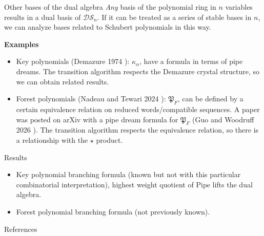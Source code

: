 \documentclass[aspectratio=169]{beamer}
\newcommand{\dcoma}{\mathcal{DS}}
\newcommand{\Forest}[1]{\mathfrak{P}_{#1}}
\newcommand{\RC}{\mathrm{Pipe}}
\begin{document}


\begin{frame}{Other bases of the dual algebra}
  \emph{Any} basis of the polynomial ring in $n$ variables results in a dual basis of $\dcoma_n$. If it can be treated as a series of stable bases in $n$, we can analyze bases related to Schubert polynomials in this way.

  \textbf{Examples}
\begin{itemize}
\item Key polynomials (Demazure 1974 \cite{demazure1974key}): $\kappa_\alpha$, have a formula in terms of pipe dreams. The transition algorithm respects the Demazure crystal structure, so we can obtain related results.
\item Forest polynomials (Nadeau and Tewari 2024 \cite{nadeau2024forest}): $\Forest{F}$, can be defined by a certain equivalence relation on reduced words/compatible sequences. 
A paper was posted on arXiv with a pipe dream formula for $\Forest{F}$ (Guo and Woodruff 2026 \cite{guo2026forest}). The transition algorithm respects the equivalence relation, so there is a relationship with the $\star$ product.
\end{itemize}
\end{frame}

\begin{frame}{Results}
\begin{theorem}[S, $2026+$]
    \begin{itemize}
    \item Key polynomial branching formula (known but not with this particular combinatorial interpretation), highest weight quotient of $\RC$ lifts the dual algebra.
    \item Forest polynomial branching formula (not previously known).
    \end{itemize}
  \end{theorem}
\end{frame}

\begin{frame}[allowframebreaks]{References}
  
  
\end{frame}
\end{document}
